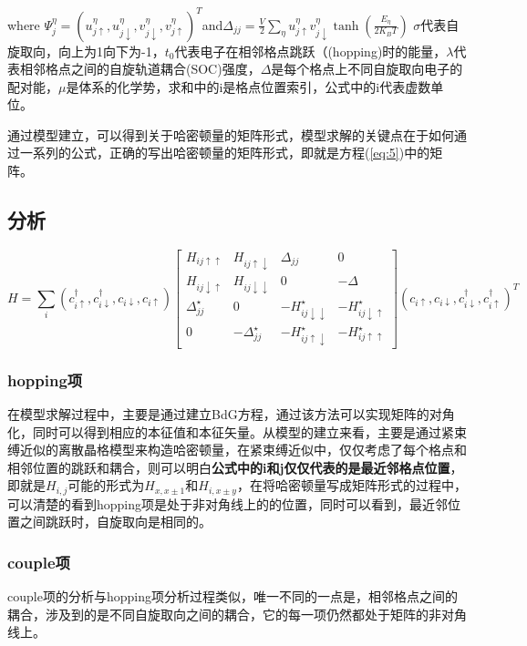 \documentclass[a4paper,12pt]{ctexart}
\numberwithin{equation}{section}
\begin{document}
where  $\Psi_j^\eta=(u_{j\uparrow}^\eta,u_{j\downarrow}^\eta,v_{j\downarrow}^\eta,v_{j\uparrow}^\eta)^T$and$\Delta_{jj}=\frac{V}{2}\sum_\eta u_{j\uparrow}^\eta v_{j\downarrow}^\eta\tanh(\frac{E_\eta}{2K_BT})$
$\sigma$代表自旋取向，向上为1向下为-1，$t_0$代表电子在相邻格点跳跃（(hopping)时的能量，$\lambda$代表相邻格点之间的自旋轨道耦合(SOC)强度，$\Delta$是每个格点上不同自旋取向电子的配对能，$\mu$是体系的化学势，求和中的i是格点位置索引，公式中的i代表虚数单位。

通过模型建立，可以得到关于哈密顿量的矩阵形式，模型求解的关键点在于如何通过一系列的公式，正确的写出哈密顿量的矩阵形式，即就是方程(\ref{eq:5})中的矩阵。
\subsection{分析}
\begin{equation}
H=\sum_i(c_{i\uparrow}^\dagger,c_{i\downarrow}^\dagger,c_{i\downarrow},c_{i\uparrow}) \left[
\begin{array}{cccc}
H_{ij\uparrow\uparrow}&H_{ij\uparrow\downarrow}&\Delta_{jj}&0\\
H_{ij\downarrow\uparrow}&H_{ij\downarrow\downarrow}&0&-\Delta\\
\Delta_{jj}^\star&0&-H_{ij\downarrow\downarrow}^\star&-H_{ij\downarrow\uparrow}^\star\\
0&-\Delta_{jj}^\star&-H_{ij\uparrow\downarrow}^\star&-H_{ij\uparrow\uparrow}^\star
\end{array}
\right](c_{i\uparrow},c_{i\downarrow},c_{i\downarrow}^\dagger,c_{i\uparrow}^\dagger)^T
\end{equation}
\subsubsection{hopping项}
在模型求解过程中，主要是通过建立BdG方程，通过该方法可以实现矩阵的对角化，同时可以得到相应的本征值和本征矢量。从模型的建立来看，主要是通过紧束缚近似的离散晶格模型来构造哈密顿量，在紧束缚近似中，仅仅考虑了每个格点和相邻位置的跳跃和耦合，则可以明白\textbf{公式中的i和j仅仅代表的是最近邻格点位置}，即就是$H_{i,j}$可能的形式为$H_{x,x\pm1}$和$H_{i,x\pm y}$，在将哈密顿量写成矩阵形式的过程中，可以清楚的看到hopping项是处于非对角线上的的位置，同时可以看到，最近邻位置之间跳跃时，自旋取向是相同的。
\subsubsection{couple项}
couple项的分析与hopping项分析过程类似，唯一不同的一点是，相邻格点之间的耦合，涉及到的是不同自旋取向之间的耦合，它的每一项仍然都处于矩阵的非对角线上。
\end{document}
